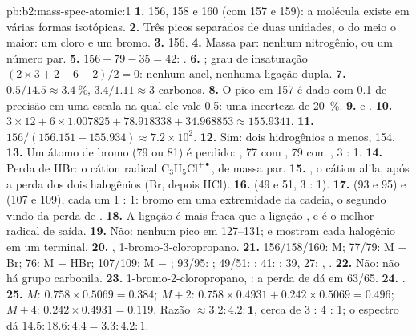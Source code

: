\begin{solution}{pb:b2:mass-spec-atomic:1}
\textbf{1.} 156, 158 e 160 (com 157 e 159): a molécula existe em várias formas isotópicas.
\textbf{2.} Três picos separados de duas unidades, o do meio o maior: um cloro e um bromo.
\textbf{3.} 156.
\textbf{4.} Massa par: nenhum nitrogênio, ou um número par.
\textbf{5.} $156 - 79 - 35 = 42$: .
\textbf{6.} ; grau de insaturação $(2 \times 3 + 2 - 6 - 2)/2 = 0$: nenhum anel, nenhuma
ligação dupla.
\textbf{7.} $0.5/14.5 \approx 3.4~\%$, $3.4/1.11 \approx 3$ carbonos.
\textbf{8.} O pico em 157 é dado com 0.1 de precisão em uma escala na qual ele vale 0.5: uma incerteza de 20~\%.
\textbf{9.}  e .
\textbf{10.} $3 \times 12 + 6 \times 1.007825 + 78.918338 + 34.968853 \approx 155.9341$.
\textbf{11.} $156/(156.151 - 155.934) \approx 7.2 \times 10^2$.
\textbf{12.} Sim: dois hidrogênios a menos, 154.
\textbf{13.} Um átomo de bromo (79 ou 81) é perdido: , 77 com , 79 com ,
3 : 1.
\textbf{14.} Perda de HBr: o cátion radical $\mathrm{C_3H_5Cl^{+\bullet}}$, de massa par.
\textbf{15.} , o cátion alila, após a perda dos dois halogênios (Br, depois HCl).
\textbf{16.}  (49 e 51, 3 : 1).
\textbf{17.}  (93 e 95) e  (107 e 109), cada um 1 : 1: bromo em uma extremidade
da cadeia, o segundo vindo da perda de .
\textbf{18.} A ligação  é mais fraca que a ligação , e  é o melhor radical de
saída.
\textbf{19.} Não: nenhum pico em 127--131;  e  mostram cada halogênio em um
 terminal.
\textbf{20.} , 1-bromo-3-cloropropano.
\textbf{21.} 156/158/160: M; 77/79: M $-$ Br; 76: M $-$ HBr; 107/109: M $-$ ;
93/95: ; 49/51: ; 41: ; 39, 27: , .
\textbf{22.} Não: não há grupo carbonila.
\textbf{23.} 1-bromo-2-cloropropano, : a perda de  dá  em 63/65.
\textbf{24.} .
\textbf{25.} $M$: $0.758 \times 0.5069 = 0.384$; $M+2$: $0.758 \times 0.4931 + 0.242 \times 0.5069 =
0.496$; $M+4$: $0.242 \times 0.4931 = 0.119$. Razão $\boldsymbol{\approx 3.2 : 4.2 : 1}$, cerca de 3 : 4 :
1; o espectro dá $14.5 : 18.6 : 4.4 = 3.3 : 4.2 : 1$.
\end{solution}
